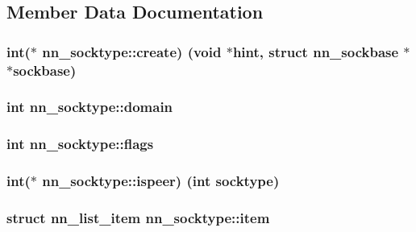 \subsection{Member Data Documentation}
\subsubsection[{create}]{\setlength{\rightskip}{0pt plus 5cm}int($\ast$ nn\+\_\+socktype\+::create) (void $\ast$hint, struct {\bf nn\+\_\+sockbase} $\ast$$\ast$sockbase)}\hypertarget{structnn__socktype_aaef1ec4f466bb440cb46ba97cf1b95fc}{}\label{structnn__socktype_aaef1ec4f466bb440cb46ba97cf1b95fc}
\subsubsection[{domain}]{\setlength{\rightskip}{0pt plus 5cm}int nn\+\_\+socktype\+::domain}\hypertarget{structnn__socktype_a865681151fabc6cc207dfe6e173f129f}{}\label{structnn__socktype_a865681151fabc6cc207dfe6e173f129f}
\subsubsection[{flags}]{\setlength{\rightskip}{0pt plus 5cm}int nn\+\_\+socktype\+::flags}\hypertarget{structnn__socktype_a2722660fbb0bd61add3cfdb00dcb48c4}{}\label{structnn__socktype_a2722660fbb0bd61add3cfdb00dcb48c4}
\subsubsection[{ispeer}]{\setlength{\rightskip}{0pt plus 5cm}int($\ast$ nn\+\_\+socktype\+::ispeer) (int socktype)}\hypertarget{structnn__socktype_a07114a5bbc9ff799c734750e310cbf2d}{}\label{structnn__socktype_a07114a5bbc9ff799c734750e310cbf2d}
\subsubsection[{item}]{\setlength{\rightskip}{0pt plus 5cm}struct {\bf nn\+\_\+list\+\_\+item} nn\+\_\+socktype\+::item}\hypertarget{structnn__socktype_a1c55011f6c127014a0d10503b1c228a5}{}\label{structnn__socktype_a1c55011f6c127014a0d10503b1c228a5}
